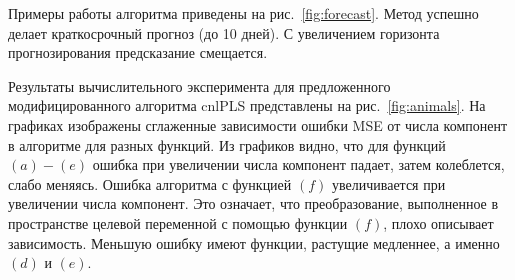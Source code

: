 \documentclass[12pt,twoside]{article}
\begin{document}
Примеры работы алгоритма приведены на рис.~\ref{fig:forecast}. Метод успешно делает краткосрочный прогноз (до 10 дней). С увеличением горизонта прогнозирования предсказание смещается. 




Результаты вычислительного эксперимента для предложенного модифицированного алгоритма cnlPLS представлены на рис.~\ref{fig:animals}. На графиках изображены сглаженные зависимости ошибки MSE от числа компонент в алгоритме для разных функций. Из графиков видно, что для функций $(a)-(e)$ ошибка при увеличении числа компонент падает, затем колеблется, слабо меняясь. Ошибка алгоритма с функцией $(f)$ увеличивается при увеличении числа компонент. Это означает, что преобразование, выполненное в пространстве целевой переменной с помощью функции $(f)$, плохо описывает зависимость. Меньшую ошибку имеют функции, растущие медленнее, а именно $(d)$ и $(e)$. 


\end{document}
